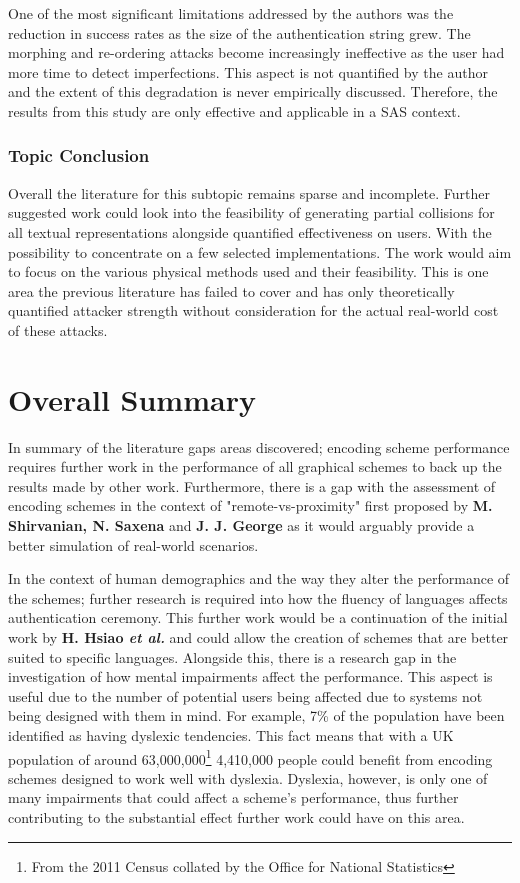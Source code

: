 One of the most significant limitations addressed by the authors  was the reduction in success rates as the size of the authentication string grew. The morphing and re-ordering  attacks become increasingly ineffective as the user had more time to detect imperfections. This aspect is not quantified by the author and the extent of this degradation is never empirically discussed. Therefore, the results from this study are only effective and applicable in a SAS context.

\subsubsection*{Topic Conclusion}
Overall the literature for this subtopic remains sparse and incomplete. Further suggested work could look into the feasibility of generating partial collisions for all textual representations alongside quantified effectiveness on users. With the possibility to concentrate on a few selected implementations. The work would aim to focus on the various physical methods used and their feasibility. This is one area the previous literature has failed to cover and has only theoretically quantified attacker strength without consideration for the actual real-world cost of these attacks.

\section{Overall Summary}
In summary of the literature gaps areas discovered; encoding scheme performance requires further work in the performance of all graphical schemes to back up the results made by other work. Furthermore, there is a gap with the assessment of encoding schemes in the context of "remote-vs-proximity" first proposed by \textbf{M. Shirvanian, N. Saxena} and \textbf{J. J. George}\cite{shirvanian2017pitfalls} as it would arguably provide a better simulation of real-world scenarios.

In the context of human demographics and the way they alter the performance of the schemes; further research is required into how the fluency of languages affects authentication ceremony. This further work would be a continuation of the initial work by \textbf{H. Hsiao \textit{et al.}}\cite{hsiao2009study} and could allow the creation of schemes that are better suited to specific languages.
Alongside this, there is a research gap in the investigation of how mental impairments affect the performance. This aspect is useful due to the number of potential users being affected due to systems not being designed with them in mind. For example, 7\% of the population have been identified as having dyslexic tendencies\cite{peterson2012developmental}. This fact means that with a UK population of around 63,000,000\footnote{From the 2011 Census collated by the Office for National Statistics}  4,410,000 people could benefit from encoding schemes designed to work well with dyslexia. Dyslexia, however, is only one of many impairments that could affect a scheme's performance, thus further contributing to the substantial effect further work could have on this area.

